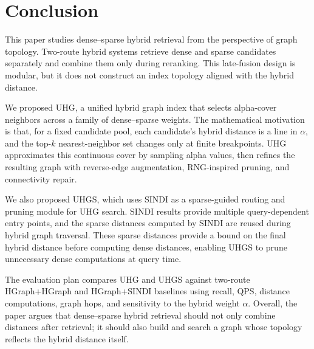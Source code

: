\section{Conclusion}
\label{sec:conclusion}

This paper studies dense--sparse hybrid retrieval from the perspective of graph topology. Two-route hybrid systems retrieve dense and sparse candidates separately and combine them only during reranking. This late-fusion design is modular, but it does not construct an index topology aligned with the hybrid distance.

We proposed UHG, a unified hybrid graph index that selects alpha-cover neighbors across a family of dense--sparse weights. The mathematical motivation is that, for a fixed candidate pool, each candidate's hybrid distance is a line in $\alpha$, and the top-$k$ nearest-neighbor set changes only at finite breakpoints. UHG approximates this continuous cover by sampling alpha values, then refines the resulting graph with reverse-edge augmentation, RNG-inspired pruning, and connectivity repair.

We also proposed UHGS, which uses SINDI as a sparse-guided routing and pruning module for UHG search. SINDI results provide multiple query-dependent entry points, and the sparse distances computed by SINDI are reused during hybrid graph traversal. These sparse distances provide a bound on the final hybrid distance before computing dense distances, enabling UHGS to prune unnecessary dense computations at query time.

The evaluation plan compares UHG and UHGS against two-route HGraph+HGraph and HGraph+SINDI baselines using recall, QPS, distance computations, graph hops, and sensitivity to the hybrid weight $\alpha$. Overall, the paper argues that dense--sparse hybrid retrieval should not only combine distances after retrieval; it should also build and search a graph whose topology reflects the hybrid distance itself.
